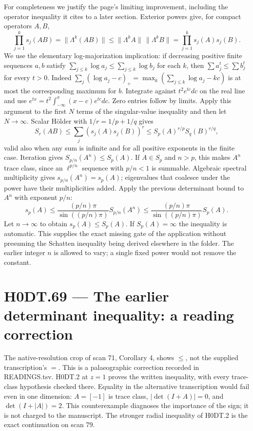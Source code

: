 For completeness we justify the page's limiting improvement, including the operator inequality it cites to a later section. Exterior powers give, for compact operators $A,B$,
\[
 \prod_{j=1}^k s_j(AB)=\|\Lambda^k(AB)\|
 \le\|\Lambda^k A\|\,\|\Lambda^k B\|
 =\prod_{j=1}^k s_j(A)s_j(B).
\]
We use the elementary log-majorization implication: if decreasing positive finite sequences $a,b$ satisfy $\sum_{j\le k}\log a_j\le\sum_{j\le k}\log b_j$ for each $k$, then $\sum a_j^t\le\sum b_j^t$ for every $t>0$. Indeed
$\sum_j(\log a_j-c)_+=\max_k(\sum_{j\le k}\log a_j-kc)$ is at most the corresponding maximum for $b$. Integrate against $t^2e^{tc}dc$ on the real line and use
$e^{tx}=t^2\int_{-\infty}^x(x-c)e^{tc}dc$.
Zero entries follow by limits. Apply this argument to the first $N$ terms of the singular-value inequality and then let $N\to\infty$. Scalar H\"older with $1/r=1/p+1/q$ gives
\[
 S_r(AB)\le\sum_j(s_j(A)s_j(B))^r
 \le S_p(A)^{r/p}S_q(B)^{r/q},
\]
valid also when any sum is infinite and for all positive exponents in the finite case. Iteration gives $S_{p/n}(A^n)\le S_p(A)$. If $A\in S_p$ and $n>p$, this makes $A^n$ trace class, since an $\ell^{p/n}$ sequence with $p/n<1$ is summable. Algebraic spectral multiplicity gives $s_{p/n}(A^n)=s_p(A)$; eigenvalues that coalesce under the power have their multiplicities added. Apply the previous determinant bound to $A^n$ with exponent $p/n$:
\[
 s_p(A)\le\frac{(p/n)\pi}{\sin((p/n)\pi)}S_{p/n}(A^n)
 \le\frac{(p/n)\pi}{\sin((p/n)\pi)}S_p(A).
\]
Let $n\to\infty$ to obtain $s_p(A)\le S_p(A)$. If $S_p(A)=\infty$ the inequality is automatic. This supplies the exact missing gate of the application without presuming the Schatten inequality being derived elsewhere in the folder. The earlier integer $n$ is allowed to vary; a single fixed power would not remove the constant.

\section*{H0DT.69 --- The earlier determinant inequality: a reading correction}
The native-resolution crop of scan 71, Corollary 4, shows $\le$, not the supplied transcription's $=$. This is a palaeographic correction recorded in READINGS.tsv. H0DT.2 at $z=1$ proves the written inequality, with every trace-class hypothesis checked there. Equality in the alternative transcription would fail even in one dimension: $A=[-1]$ is trace class, $|\det(I+A)|=0$, and $\det(I+|A|)=2$. This counterexample diagnoses the importance of the sign; it is not charged to the manuscript. The stronger radial inequality of H0DT.2 is the exact continuation on scan 79.

